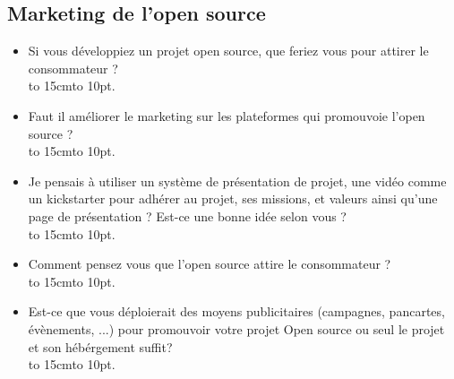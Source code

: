 \begin{appendices}
\section{Marketing de l'open source}

\begin{itemize}[label=\textbullet, font=\LARGE \color{burntorange}]
	\item Si vous développiez un projet open source, que feriez vous pour attirer le consommateur ?\\
	\hbox to 15cm{\leaders\hbox to 10pt{\hss . \hss}\hfil}
	\item Faut il améliorer le marketing sur les plateformes qui promouvoie l'open source ?\\
	\hbox to 15cm{\leaders\hbox to 10pt{\hss . \hss}\hfil}
	\item Je pensais à utiliser un système de présentation de projet, une vidéo comme un kickstarter pour adhérer au projet, ses missions, et valeurs ainsi qu'une page de présentation ? Est-ce une bonne idée selon vous ?\\
	\hbox to 15cm{\leaders\hbox to 10pt{\hss . \hss}\hfil}
	\item Comment pensez vous que l'open source attire le consommateur ?\\
	\hbox to 15cm{\leaders\hbox to 10pt{\hss . \hss}\hfil}
	\item Est-ce que vous déploierait des moyens publicitaires (campagnes, pancartes, évènements, ...) pour promouvoir votre projet Open source ou seul le projet et son hébérgement suffit?\\
	\hbox to 15cm{\leaders\hbox to 10pt{\hss . \hss}\hfil}
\end{itemize}

\end{appendices}